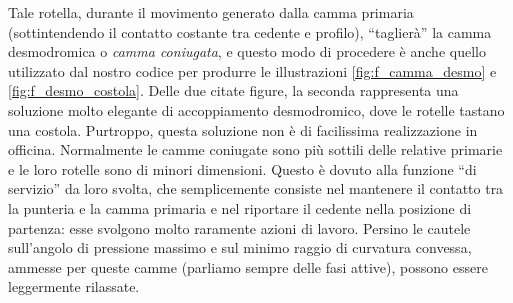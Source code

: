 \noindent Tale 
rotella, durante il movimento generato dalla camma primaria (sottintendendo il contatto
costante tra cedente e profilo),  ``taglier\`a'' la camma desmodromica o {\em
camma coniugata}, e questo modo di 
procedere \`e anche quello utilizzato dal nostro codice
per produrre le illustrazioni \ref{fig:f_camma_desmo} e 
\ref{fig:f_desmo_costola}. Delle due citate figure, la seconda rappresenta
una soluzione molto elegante di accoppiamento
desmodromico, dove le rotelle tastano una costola. Purtroppo, questa
soluzione non \`e
di facilissima realizzazione in officina. Normalmente le camme coniugate
sono pi\`u sottili delle relative primarie e le loro rotelle sono di
minori dimensioni.
Questo \`e dovuto alla funzione ``di servizio'' da loro svolta,
che semplicemente consiste nel mantenere il contatto tra la punteria e la
camma primaria
e nel riportare il cedente nella posizione di partenza: esse
svolgono molto raramente azioni di lavoro. Persino le cautele sull'angolo di
pressione massimo e sul minimo raggio di curvatura convessa,
ammesse per queste camme 
(parliamo sempre delle fasi attive), possono essere leggermente rilassate.

